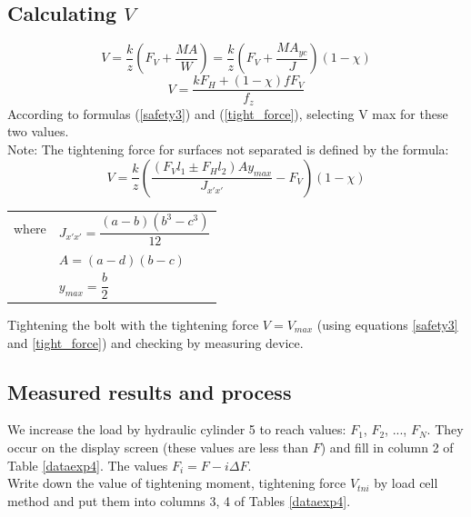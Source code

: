 \subsection{Calculating $ V $}
\begin{equation}
	V = \dfrac{k}{z}\left(F_V+\dfrac{MA}{W}\right) = \dfrac{k}{z}\left(F_V+\dfrac{MA_{yc}}{J}\right)(1-\chi)
	\label{safety3}
\end{equation}
\begin{equation}
	V = \dfrac{kF_H+(1-\chi)fF_V}{f_z}
	\label{tight_force}
\end{equation}
According to formulas (\ref{safety3}) and (\ref{tight_force}), selecting V max for these two values.\\
Note: The tightening force for surfaces not separated is defined by the formula:
\[V = \dfrac{k}{z}\left(\dfrac{(F_Vl_1\pm F_Hl_2)Ay_{max}}{J_{x'x'}}-F_V\right)(1-\chi)\]
\begin{tabular}{ll}
	where & $ J_{x'x'} = \dfrac{(a-b)(b^3-c^3)}{12} $\\
	& $ A = (a-d)(b-c) $\\
	& $ y_{max} = \dfrac{b}{2} $\\
\end{tabular}\vskip2mm
Tightening the bolt with the tightening force $ V = V_{max} $ (using equations \ref{safety3} and \ref{tight_force}) and
checking by measuring device.
\subsection{Measured results and process}
We increase the load by hydraulic cylinder 5 to reach values: $ F_1 $, $ F_2 $, ..., $ F_N $. They occur on the display screen (these values are less than $ F $) and fill in column 2 of Table \ref{dataexp4}. The values $ F_i = F - i\Delta F $.\\
Write down the value of tightening moment, tightening force $ V_{tni} $ by load cell method
and put them into columns 3, 4 of Tables \ref{dataexp4}.
